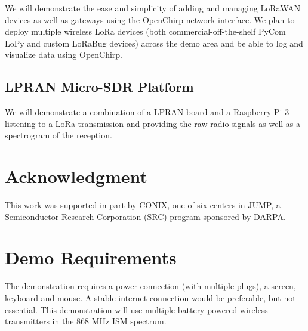 \documentclass[conference]{IEEEtran}
\begin{document}
We will demonstrate the ease and simplicity of adding and managing LoRaWAN
devices as well as gateways using the OpenChirp network interface. We plan to
deploy multiple wireless LoRa devices (both commercial-off-the-shelf PyCom
LoPy and custom LoRaBug devices) across the demo area and be able to log and
visualize data using OpenChirp.


\subsection{LPRAN Micro-SDR Platform}
\label{sec:lpran-demo}

We will demonstrate a combination of a LPRAN board and a Raspberry Pi 3
listening to a LoRa transmission and providing the raw radio signals as well
as a spectrogram of the reception.

\section*{Acknowledgment}

This work was supported in part by CONIX, one of six centers in JUMP, a Semiconductor Research Corporation (SRC) program sponsored by DARPA.



\section{Demo Requirements}
\label{sec:requirements}

The demonstration requires a power connection (with multiple plugs), a screen,
keyboard and mouse. A stable internet connection would be preferable, but not
essential. This demonstration will use multiple battery-powered wireless
transmitters in the 868 MHz ISM spectrum.
\end{document}
